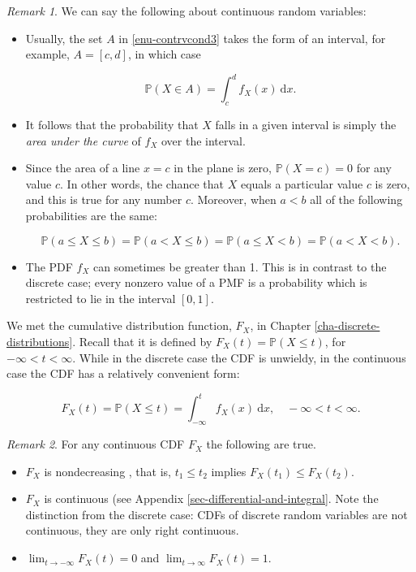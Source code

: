 \documentclass[]{book}
\providecommand{\tightlist}{%
  \setlength{\itemsep}{0pt}\setlength{\parskip}{0pt}}
\numberwithin{equation}{chapter}
\numberwithin{figure}{chapter}
\theoremstyle{plain}
\theoremstyle{definition}
\theoremstyle{remark}
\theoremstyle{definition}
\theoremstyle{definition}
\theoremstyle{remark}
\newtheorem*{remark}{Remark}
\begin{document}
\bigskip

\begin{remark}
We can say the following about continuous random variables:

\begin{itemize}
\tightlist
\item
  Usually, the set \(A\) in \ref{enu-contrvcond3} takes the form of an
  interval, for example, \(A=[c,d]\), in which case

  \begin{equation}
    \mathbb{P}(X\in A)=\int_{c}^{d}f_{X}(x)\:\mathrm{d} x.
    \end{equation}
\item
  It follows that the probability that \(X\) falls in a given interval
  is simply the \emph{area under the curve} of \(f_{X}\) over the
  interval.
\item
  Since the area of a line \(x=c\) in the plane is zero,
  \(\mathbb{P}(X=c)=0\) for any value \(c\). In other words, the chance
  that \(X\) equals a particular value \(c\) is zero, and this is true
  for any number \(c\). Moreover, when \(a<b\) all of the following
  probabilities are the same:

  \begin{equation}
    \mathbb{P}(a\leq X\leq b)=\mathbb{P}(a<X\leq b)=\mathbb{P}(a\leq X<b)=\mathbb{P}(a<X<b).
    \end{equation}
\item
  The PDF \(f_{X}\) can sometimes be greater than 1. This is in contrast
  to the discrete case; every nonzero value of a PMF is a probability
  which is restricted to lie in the interval \([0,1]\).
\end{itemize}
\end{remark}

We met the cumulative distribution function, \(F_{X}\), in Chapter
\ref{cha-discrete-distributions}. Recall that it is defined by
\(F_{X}(t)=\mathbb{P}(X\leq t)\), for \(-\infty<t<\infty\). While in the
discrete case the CDF is unwieldy, in the continuous case the CDF has a
relatively convenient form:

\begin{equation}
F_{X}(t)=\mathbb{P}(X\leq t)=\int_{-\infty}^{t}f_{X}(x)\:\mathrm{d} x,\quad -\infty < t < \infty.
\end{equation}

\bigskip

\begin{remark}
For any continuous CDF \(F_{X}\) the following are true.

\begin{itemize}
\tightlist
\item
  \(F_{X}\) is nondecreasing , that is, \(t_{1}\leq t_{2}\) implies
  \(F_{X}(t_{1})\leq F_{X}(t_{2})\).
\item
  \(F_{X}\) is continuous (see Appendix
  \ref{sec-differential-and-integral}. Note the distinction from the
  discrete case: CDFs of discrete random variables are not continuous,
  they are only right continuous.
\item
  \(\lim_{t\to-\infty}F_{X}(t)=0\) and \(\lim_{t\to\infty}F_{X}(t)=1\).
\end{itemize}
\end{remark}
\end{document}
